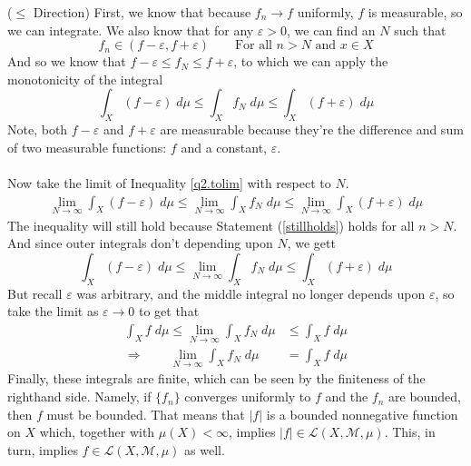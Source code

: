 \documentclass[12pt]{article}
\theoremstyle{plain}
\theoremstyle{definition}
\theoremstyle{remark}
\begin{document}
\begin{enumerate}
\begin{enumerate}
($\leq$ Direction) First, we know that because $f_n\rightarrow f$ uniformly, $f$ is measurable, so we can integrate. We also know that for any $\varepsilon>0$, we can find an $N$ such that 
\begin{equation}
    \label{stillholds}
    f_n \in (f-\varepsilon, f+\varepsilon) 
    \qquad \text{For all $n>N$ and $x\in X$}
\end{equation}
And so we know that $f-\varepsilon\leq f_N\leq f+\varepsilon$, to which we can apply the monotonicity of the integral
\begin{equation}
    \label{q2.tolim}
    \int_X (f-\varepsilon) \; d\mu\leq
    \int_X f_N \; d\mu \leq \int_X (f+\varepsilon) \; d\mu
\end{equation}
Note, both $f-\varepsilon$ and $f+\varepsilon$ are measurable because they're the difference and sum of two measurable functions: $f$ and a constant, $\varepsilon$. 
\\
\\
Now take the limit of Inequality \ref{q2.tolim} with respect to $N$. 
\begin{align*}
    \lim_{N\rightarrow\infty} \int_X (f-\varepsilon) \; d\mu
    \leq \lim_{N\rightarrow\infty}
    \int_X f_N \; d\mu \leq 
    \lim_{N\rightarrow\infty}\int_X (f+\varepsilon) \; d\mu
\end{align*}
The inequality will still hold because Statement (\ref{stillholds}) holds for all $n>N$. And since outer integrals don't depending upon $N$, we gett
\begin{equation}
    \int_X (f-\varepsilon) \; d\mu \leq
    \lim_{N\rightarrow\infty}\int_X f_N \; d\mu \leq 
    \int_X (f+\varepsilon) \; d\mu
\end{equation}
But recall $\varepsilon$ was arbitrary, and the middle integral no longer depends upon $\varepsilon$, so take the limit as $\varepsilon\rightarrow0$ to get that 
\begin{align*}
    \int_X f \; d\mu \leq
    \lim_{N\rightarrow\infty}\int_X f_N \; d\mu &\leq 
    \int_X f \; d\mu \\
    \Rightarrow\qquad
    \lim_{N\rightarrow\infty}\int_X f_N \; d\mu &=
    \int_X f \; d\mu 
\end{align*}
Finally, these integrals are finite, which can be seen by the finiteness of the righthand side. Namely, if $\{f_n\}$ converges uniformly to $f$ and the $f_n$ are bounded, then $f$ must be bounded. That means that $|f|$ is a bounded nonnegative function on $X$ which, together with $\mu(X)<\infty$, implies $|f|\in\mathscr{L}(X,\mathscr{M},\mu)$. This, in turn, implies $f\in\mathscr{L}(X,\mathscr{M},\mu)$ as well.
\end{enumerate}


\end{enumerate}
\end{document}
